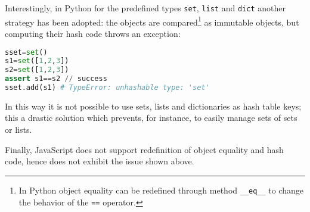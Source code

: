 Interestingly, in Python for the predefined types \lstinline{set}, \lstinline{list} and \lstinline{dict} another strategy has been adopted: the objects are compared\footnote{In Python object equality can be redefined through method \lstinline{__eq__} to change the behavior of the \lstinline{==} operator.} as
immutable objects, but computing their hash code throws an exception:
\begin{lstlisting}[language=Python]
sset=set()                                                           
s1=set([1,2,3])
s2=set([1,2,3])
assert s1==s2 // success
sset.add(s1) # TypeError: unhashable type: 'set'       
\end{lstlisting}
In this way it is not possible to use sets, lists and dictionaries as hash table keys; this a drastic solution which prevents, for instance, to easily manage sets of sets or lists. 

Finally, JavaScript does not support redefinition of object equality and hash code, hence does not exhibit the issue shown above. 
